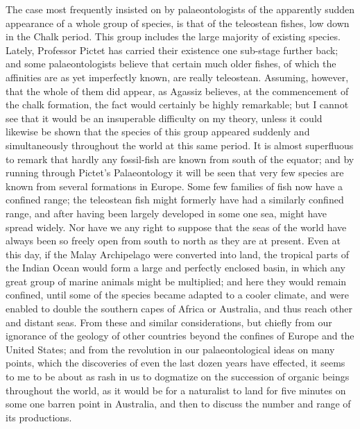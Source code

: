 The case most frequently insisted on by palaeontologists of the apparently sudden appearance of a whole group of species, is that of the teleostean fishes, low down in the Chalk period. This group includes the large majority of existing species. Lately, Professor Pictet has carried their existence one sub-stage further back; and some palaeontologists believe that certain much older fishes, of which the affinities are as yet imperfectly known, are really teleostean. Assuming, however, that the whole of them did appear, as Agassiz believes, at the commencement of the chalk formation, the fact would certainly be highly remarkable; but I cannot see that it would be an insuperable difficulty on my theory, unless it could likewise be shown that the species of this group appeared suddenly and simultaneously throughout the world at this same period. It is almost superfluous to remark that hardly any fossil-fish are known from south of the equator; and by running through Pictet's Palaeontology it will be seen that very few species are known from several formations in Europe. Some few families of fish now have a confined range; the teleostean fish might formerly have had a similarly confined range, and after having been largely developed in some one sea, might have spread widely. Nor have we any right to suppose that the seas of the world have always been so freely open from south to north as they are at present. Even at this day, if the Malay Archipelago were converted into land, the tropical parts of the Indian Ocean would form a large and perfectly enclosed basin, in which any great group of marine animals might be multiplied; and here they would remain confined, until some of the species became adapted to a cooler climate, and were enabled to double the southern capes of Africa or Australia, and thus reach other and distant seas.
From these and similar considerations, but chiefly from our ignorance of the geology of other countries beyond the confines of Europe and the United States; and from the revolution in our palaeontological ideas on many points, which the discoveries of even the last dozen years have effected, it seems to me to be about as rash in us to dogmatize on the succession of organic beings throughout the world, as it would be for a naturalist to land for five minutes on some one barren point in Australia, and then to discuss the number and range of its productions.

